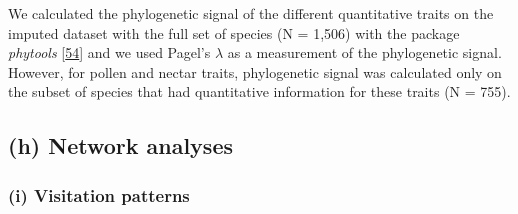 \documentclass[
  12pt,
  a4paper,
]{article}
\begin{document}
We calculated the phylogenetic signal of the different quantitative traits on the imputed dataset with the full set of species (N = 1,506) with the package \emph{phytools} {[}\protect\hyperlink{ref-revell2012}{54}{]} and we used Pagel's \(\lambda\) as a measurement of the phylogenetic signal. However, for pollen and nectar traits, phylogenetic signal was calculated only on the subset of species that had quantitative information for these traits (N = 755).

\hypertarget{h-network-analyses}{%
\subsection{(h) Network analyses}\label{h-network-analyses}}

\hypertarget{i-visitation-patterns}{%
\subsubsection{(i) Visitation patterns}\label{i-visitation-patterns}}
\end{document}
